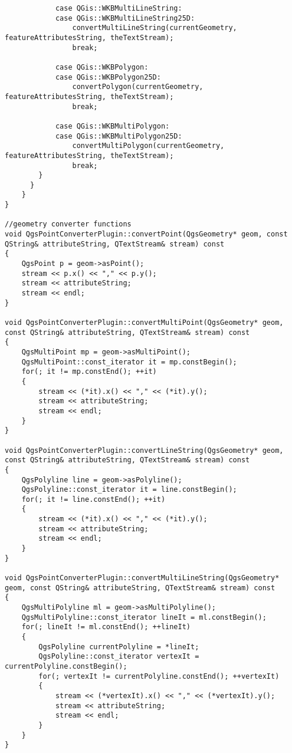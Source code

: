 \begin{verbatim}
            case QGis::WKBMultiLineString:
            case QGis::WKBMultiLineString25D:
                convertMultiLineString(currentGeometry, featureAttributesString, theTextStream);
                break;

            case QGis::WKBPolygon:
            case QGis::WKBPolygon25D:
                convertPolygon(currentGeometry, featureAttributesString, theTextStream);
                break;

            case QGis::WKBMultiPolygon:
            case QGis::WKBMultiPolygon25D:
                convertMultiPolygon(currentGeometry, featureAttributesString, theTextStream);
                break;
        }
      }
    }
}

//geometry converter functions
void QgsPointConverterPlugin::convertPoint(QgsGeometry* geom, const QString& attributeString, QTextStream& stream) const
{
    QgsPoint p = geom->asPoint();
    stream << p.x() << "," << p.y();
    stream << attributeString;
    stream << endl;
}

void QgsPointConverterPlugin::convertMultiPoint(QgsGeometry* geom, const QString& attributeString, QTextStream& stream) const
{
    QgsMultiPoint mp = geom->asMultiPoint();
    QgsMultiPoint::const_iterator it = mp.constBegin();
    for(; it != mp.constEnd(); ++it)
    {
        stream << (*it).x() << "," << (*it).y();
        stream << attributeString;
        stream << endl;
    }
}

void QgsPointConverterPlugin::convertLineString(QgsGeometry* geom, const QString& attributeString, QTextStream& stream) const
{
    QgsPolyline line = geom->asPolyline();
    QgsPolyline::const_iterator it = line.constBegin();
    for(; it != line.constEnd(); ++it)
    {
        stream << (*it).x() << "," << (*it).y();
        stream << attributeString;
        stream << endl;
    }
}

void QgsPointConverterPlugin::convertMultiLineString(QgsGeometry* geom, const QString& attributeString, QTextStream& stream) const
{
    QgsMultiPolyline ml = geom->asMultiPolyline();
    QgsMultiPolyline::const_iterator lineIt = ml.constBegin();
    for(; lineIt != ml.constEnd(); ++lineIt)
    {
        QgsPolyline currentPolyline = *lineIt;
        QgsPolyline::const_iterator vertexIt = currentPolyline.constBegin();
        for(; vertexIt != currentPolyline.constEnd(); ++vertexIt)
        {
            stream << (*vertexIt).x() << "," << (*vertexIt).y();
            stream << attributeString;
            stream << endl;
        }
    }
}


\end{verbatim}
